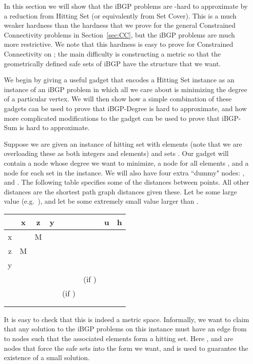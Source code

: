 \documentclass[11pt,letterpaper]{article}
\theoremstyle{definition}
\newcounter{note}[section]
\begin{document}
In this section we will show that the iBGP problems are -hard to approximate by a reduction from {\sc Hitting Set} (or
equivalently from {\sc Set Cover}).  This is a much weaker hardness
than the  hardness that we prove for the general
Constrained Connectivity problems in Section~\ref{sec:CC}, but the iBGP problems are much more
restrictive.  We note that this  hardness is easy to prove for Constrained Connectivity on ; the main difficulty is constructing a metric so that the geometrically defined safe sets of iBGP have the structure that we want.

We begin by giving a useful gadget that
encodes a {\sc Hitting Set} instance as an instance of an iBGP problem
in which all we care about is minimizing the degree of a particular
vertex.  We will then show how a simple combination of these gadgets
can be used to prove that {\sc iBGP-Degree} is hard to approximate,
and how more complicated modifications to the gadget can be used to
prove that {\sc iBGP-Sum} is hard to approximate.

Suppose we are given an instance of hitting set with elements  (note that we are overloading these as both integers and
elements) and sets .  Our gadget will contain
a node  whose degree we want to minimize, a node  for all
elements , and a node  for each set
 in the instance.  We will also have four extra ``dummy" nodes:
, and .  The following table specifies some of the distances
between points.  All other distances are the shortest path graph
distances given these. Let  be some large value (e.g.~), and let 
be some extremely small value larger than .

\begin{center}
\begin{tabular}{c|ccccccc}
 & x & z & y &  &  & u & h \\
\hline
x &  & M &  &  &  & &  \\
z & M & &   &  &  &  &  \\
y & &  & & \\
 & & & & &  (if ) & &  \\
 &  & & &  (if ) & & &  \\
 & &  & & \\
 &  & & & & 
\end{tabular}
\end{center}

It is easy to check that this is indeed a metric space.  Informally,
we want to claim that any solution to the iBGP problems on this
instance must have an edge from  to  nodes such that the
associated elements  form a hitting set.  Here , and  are nodes that force the safe sets into the form we want, and  is used to guarantee the existence of a small solution.
\end{document}
